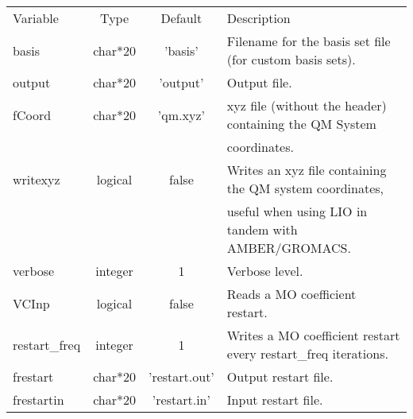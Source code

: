 \documentclass[journal=jctcce,manuscript=article]{achemso}
\begin{document}
    \begin{table}  [H]
      \begin{center}
      \begin{tabular}{ l c c l}
         Variable      & Type    & Default  & Description \\
         basis         & char*20 & 'basis'  & Filename for the basis set file (for custom basis sets). \\
         output        & char*20 & 'output' & Output file. \\
         fCoord        & char*20 & 'qm.xyz' & xyz file (without the header) containing the QM System \\
         & &                                & coordinates. \\
         writexyz      & logical & false 	& Writes an xyz file containing the QM system coordinates, \\
         & & 	                            & useful when using LIO in tandem with AMBER/GROMACS. \\
         verbose       & integer & 1        & Verbose level. \\
         VCInp         & logical & false    & Reads a MO coefficient restart.\\
         restart\_freq & integer & 1        & Writes a MO coefficient restart every restart\_freq iterations.\\
         frestart      & char*20 & 'restart.out' & Output restart file. \\
         frestartin    & char*20 & 'restart.in'  & Input restart file. \\
       \end{tabular}
       \end{center}
      \label{lio.fileio.var}
    \end{table}
\end{document}
